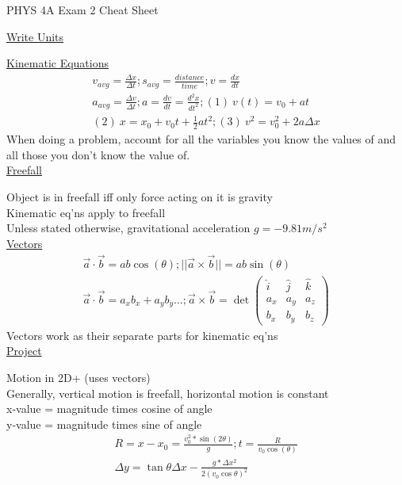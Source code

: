 \documentclass[8pt]{minimal}
\begin{document}
\setlength{\parindent}{0pt}
\twocolumn
PHYS 4A Exam 2 Cheat Sheet

\underline{Write Units}

\underline{Kinematic Equations}
\begin{gather*}
    v_{avg}=\frac{\Delta x}{\Delta t}; s_{avg}=\frac{distance}{time};v=\frac{dx}{dt}\\
    a_{avg}=\frac{\Delta v}{\Delta t}; a = \frac{dv}{dt} = \frac{d^2x}{dt^2}; (1)\ v(t) = v_0 + at\\
    (2)\ x = x_0 + v_0t + \frac{1}{2}at^2; (3)\ v^2 = v_0^2 + 2a\Delta x
\end{gather*}
When doing a problem, account for all the variables you know the values of and all those you don't know the value of.\\

\underline{Freefall}

Object is in freefall iff only force acting on it is gravity\\
Kinematic eq'ns apply to freefall\\
Unless stated otherwise, gravitational acceleration $g=-9.81m/s^2$\\

\underline{Vectors}
\begin{gather*}
    \vec{a} \cdot \vec{b} = ab \cos(\theta); || \vec{a}\times \vec{b} || = ab \sin(\theta)\\
    \vec{a} \cdot \vec{b} = a_x b_x+a_y b_y\dots; \vec{a}\times \vec{b} = \det \left( \begin{smallmatrix} \hat{i} & \hat{j} &\hat{k} \\ a_x & a_y & a_z \\ b_x & b_y & b_z  \end{smallmatrix} \right)
\end{gather*}
Vectors work as their separate parts for kinematic eq'ns
\\

\underline{Project}

Motion in 2D+ (uses vectors)\\
Generally, vertical motion is freefall, horizontal motion is constant \\
x-value = magnitude times cosine of angle\\
y-value = magnitude times sine of angle\\
\begin{gather*}
    R=x-x_0=\frac{v_0^2*\sin(2\theta)}{g};t=\frac{R}{v_0  \cos(\theta)}\\
    \Delta y =\tan\theta \Delta x - \frac{g*\Delta x^2}{2(v_0  \cos\theta)^2 }
\end{gather*}
\end{document}
